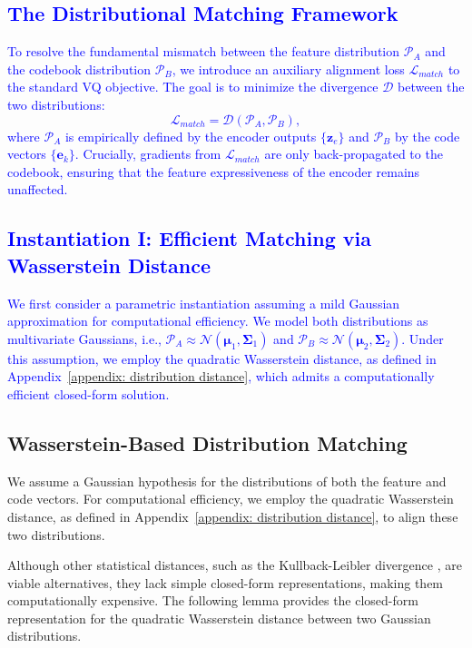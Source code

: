 \textcolor{blue}{\subsection{The Distributional Matching Framework}
To resolve the fundamental mismatch between the feature distribution $\mathcal{P}_A$ and the codebook distribution $\mathcal{P}_B$, we introduce an auxiliary alignment loss $\mathcal{L}_{match}$ to the standard VQ objective. The goal is to minimize the divergence $\mathcal{D}$ between the two distributions:
\begin{equation}
    \mathcal{L}_{match} = \mathcal{D}(\mathcal{P}_A, \mathcal{P}_B),
\end{equation}
where $\mathcal{P}_A$ is empirically defined by the encoder outputs $\{\bm{z}_e\}$ and $\mathcal{P}_B$ by the code vectors $\{\bm{e}_k\}$. Crucially, gradients from $\mathcal{L}_{match}$ are only back-propagated to the codebook, ensuring that the feature expressiveness of the encoder remains unaffected.
}

\textcolor{blue}{\subsection{Instantiation I: Efficient Matching via Wasserstein Distance}\label{sec:wasserstein}
We first consider a parametric instantiation assuming a mild Gaussian approximation for computational efficiency. We model both distributions as multivariate Gaussians, i.e., $\mathcal{P}_A \approx \mathcal{N}(\bm{\mu}_1, \bm{\Sigma}_1)$ and $\mathcal{P}_B \approx \mathcal{N}(\bm{\mu}_2, \bm{\Sigma}_2)$. Under this assumption, we employ the quadratic Wasserstein distance, as defined in Appendix~\ref{appendix: distribution distance}, which admits a computationally efficient closed-form solution. 
}

\subsection{Wasserstein-Based Distribution Matching}
\label{sec:wasserstein distance}

We assume a Gaussian hypothesis for the distributions of both the feature and code vectors. For computational efficiency, we employ the quadratic Wasserstein distance, as defined in Appendix~\ref{appendix: distribution distance},  to align these two distributions. 

Although other statistical distances, such as the Kullback-Leibler divergence \citep{Kingma2013AutoEncodingVB, Ho2020DenoisingDP}, are viable alternatives, they lack simple closed-form representations, making them computationally expensive. The following lemma provides the closed-form representation for the quadratic Wasserstein distance between two Gaussian distributions.  

